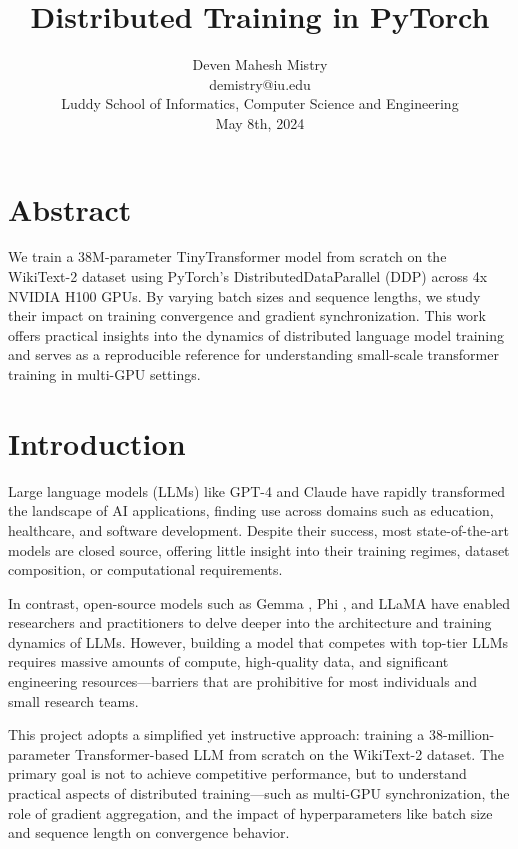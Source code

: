\documentclass[conference]{IEEEtran}
\title{Distributed Training in PyTorch}
\author{%
    Deven Mahesh Mistry \\
    demistry@iu.edu \\
    Luddy School of Informatics, Computer Science and Engineering \\
    May 8th, 2024}
\begin{document}
\maketitle

\section*{Abstract}

We train a 38M-parameter TinyTransformer model from scratch on the WikiText-2 dataset using PyTorch's DistributedDataParallel (DDP) across 4x NVIDIA H100 GPUs. By varying batch sizes and sequence lengths, we study their impact on training convergence and gradient synchronization. This work offers practical insights into the dynamics of distributed language model training and serves as a reproducible reference for understanding small-scale transformer training in multi-GPU settings.

\section{Introduction}

Large language models (LLMs) like GPT-4 \cite{achiam2023gpt} and Claude \cite{claude3family} have rapidly transformed the landscape of AI applications, finding use across domains such as education, healthcare, and software development. Despite their success, most state-of-the-art models are closed source, offering little insight into their training regimes, dataset composition, or computational requirements.

In contrast, open-source models such as Gemma \cite{team2025gemma}, Phi \cite{abdin2024phi}, and LLaMA \cite{grattafiori2024llama} have enabled researchers and practitioners to delve deeper into the architecture and training dynamics of LLMs. However, building a model that competes with top-tier LLMs requires massive amounts of compute, high-quality data, and significant engineering resources—barriers that are prohibitive for most individuals and small research teams.

This project adopts a simplified yet instructive approach: training a 38-million-parameter Transformer-based \cite{vaswani2017attention} LLM from scratch on the WikiText-2 \cite{merity2016pointer} dataset. The primary goal is not to achieve competitive performance, but to understand practical aspects of distributed training—such as multi-GPU synchronization, the role of gradient aggregation, and the impact of hyperparameters like batch size and sequence length on convergence behavior.
\end{document}
